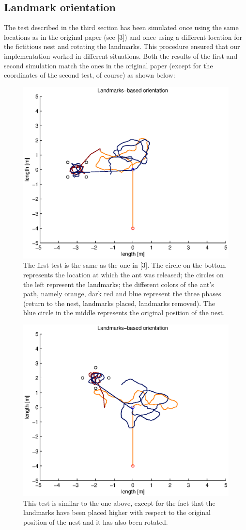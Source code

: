 \documentclass[11pt]{article}
\begin{document}
\subsection{Landmark orientation}
The test described in the third section has been simulated once using the same locations as in the original paper (see [3]) and once using a different location for the fictitious nest and rotating the landmarks. This procedure ensured that our implementation worked in different situations. Both the results of the first and second simulation match the ones in the original paper (except for the coordinates of the second test, of course) as shown below:
\begin{figure}[h!]
	\centering
	\includegraphics[width=.8\textwidth]{../sources/results/fourLandmarksResults/fourLandmarks.eps}
	\caption{The first test is the same as the one in [3]. The circle on the bottom represents the location at which the ant was released; the circles on the left represent the landmarks; the different colors of the ant's path, namely orange, dark red and blue represent the three phases (return to the nest, landmarks placed, landmarks removed). The blue circle in the middle represents the original position of the nest.}
\end{figure}
\begin{figure}[h!]
	\centering
	\includegraphics[width=.8\textwidth]{../sources/results/fourLandmarksResults/fourLandmarksRotated.eps}
	\caption{This test is similar to the one above, except for the fact that the landmarks have been placed higher with respect to the original position of the nest and it has also been rotated.}
\end{figure}
\end{document}
